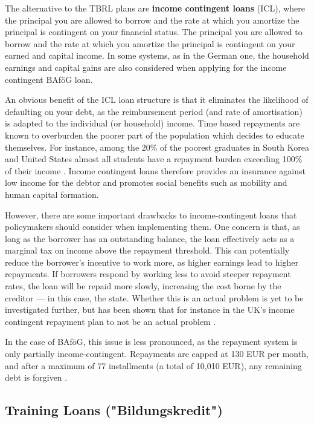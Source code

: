 The alternative to the TBRL plans are \textbf{income contingent loans} (ICL), where the 
principal you are allowed to borrow and the rate at which you amortize the principal is contingent on your financial status. The principal you are allowed to borrow and the 
rate at which you amortize the principal is contingent on your earned 
and capital income. In some systems, as in the German one, the household earnings 
and capital gains are also considered when applying for the income contingent BAföG loan.

An obvious benefit of the ICL loan structure is that it eliminates the likelihood 
of defaulting on your debt, as the reimbursement period 
(and rate of amortisation) is adapted to the individual (or household) income. 
Time based repayments are known to overburden the poorer part of the population which decides to 
educate themselves. For instance, among the 20\% of the poorest graduates in South Korea and United States 
almost all students have a repayment burden exceeding 100\% of their income 
\citep{chapman_income-contingent_2022}. 
Income contingent loans therefore provides an insurance against low income for the debtor and promotes social benefits such as mobility and human capital formation.

However, there are some important drawbacks to income-contingent loans that policymakers should consider when implementing them. 
One concern is that, as long as the borrower has an outstanding balance, the loan effectively acts as a marginal tax on income above the repayment threshold. 
This can potentially reduce the borrower’s incentive to work more, as higher earnings lead to higher repayments. 
If borrowers respond by working less to avoid steeper repayment rates, the loan will be repaid more slowly, increasing the cost borne by the creditor — in this case, the state.
Whether this is an actual problem is yet to be investigated further, but has been
shown that for instance in the UK's income contingent repayment plan to not 
be an actual problem \citep{britton_income_2020}. 

In the case of BAföG, this issue is less pronounced, as the repayment system is only partially income-contingent. Repayments are capped at 130 EUR per month, and after a maximum of 77 installments (a total of 10,010 EUR), any remaining debt is forgiven \citep{studentenwerk_bafog}.




\subsection{Training Loans ("Bildungskredit")}


